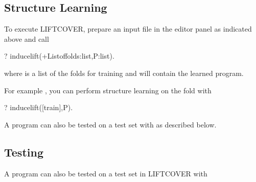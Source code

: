 \documentclass[letterpaper,10pt,english]{sphinxmanual}
\begin{document}
\subsection{Structure Learning}
\label{\detokenize{index:structure-learning}}
\sphinxAtStartPar
To execute LIFTCOVER, prepare an input file in the editor panel as indicated above and call

\begin{sphinxVerbatim}[commandchars=\\\{\}]
?\PYGZhy{} induce\PYGZus{}lift(+List\PYGZus{}of\PYGZus{}folds:list,\PYGZhy{}P:list).
\end{sphinxVerbatim}

\sphinxAtStartPar
where  is a list of the folds for training and  will contain the learned program.

\sphinxAtStartPar
For example , you can perform structure learning on the  fold with

\begin{sphinxVerbatim}[commandchars=\\\{\}]
?\PYGZhy{} induce\PYGZus{}lift([train],P).
\end{sphinxVerbatim}

\sphinxAtStartPar
A program can also be tested on a test set with   as described below.


\subsection{Testing}
\label{\detokenize{index:testing}}
\sphinxAtStartPar
A program can also be tested on a test set in LIFTCOVER with

\begin{sphinxVerbatim}[commandchars=\\\{\}]
  
\end{sphinxVerbatim}
\end{document}
